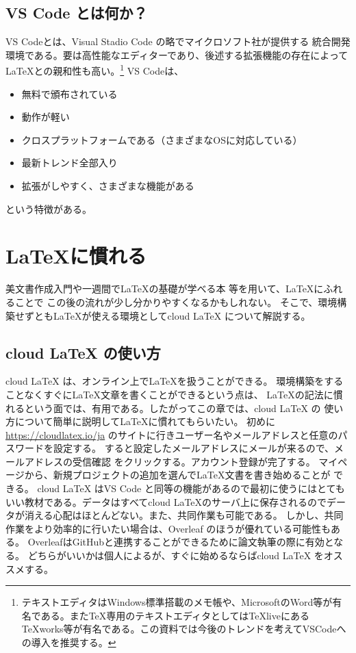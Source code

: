 \documentclass[titlepage]{ltjsarticle}
\begin{document}
\subsection{VS Code とは何か？}
VS Codeとは、Visual Stadio Code の略でマイクロソフト社が提供する
統合開発環境である。要は高性能なエディターであり、後述する拡張機能の存在によって\LaTeX との親和性も高い。\footnote{テキストエディタはWindows標準搭載のメモ帳や、MicrosoftのWord等が有名である。またTeX専用のテキストエディタとしてはTeXliveにあるTeXworks等が有名である。この資料では今後のトレンドを考えてVSCodeへの導入を推奨する。}
VS Codeは、
\begin{itemize}
  \item 無料で頒布されている
  \item 動作が軽い
  \item クロスプラットフォームである（さまざまなOSに対応している）
  \item 最新トレンド全部入り
  \item 拡張がしやすく、さまざまな機能がある
\end{itemize}
という特徴がある。

\section{\LaTeX に慣れる}
美文書作成入門\cite{美文書本}や一週間で\LaTeX の基礎が学べる本
\cite{一週間基礎}等を用いて、\LaTeX にふれることで
この後の流れが少し分かりやすくなるかもしれない。
そこで、環境構築せずとも\LaTeX が使える環境としてcloud LaTeX 
について解説する。

\subsection{cloud LaTeX の使い方}
cloud LaTeX は、オンライン上で\LaTeX を扱うことができる。
環境構築をすることなくすぐに\LaTeX 文章を書くことができるという点は、
\LaTeX の記法に慣れるという面では、有用である。したがってこの章では、cloud LaTeX の
使い方について簡単に説明して\LaTeX に慣れてもらいたい。
初めに
\url{https://cloudlatex.io/ja}\cite{cloudlatexログインページ}
のサイトに行きユーザー名やメールアドレスと任意のパスワードを設定する。
すると設定したメールアドレスにメールが来るので、メールアドレスの受信確認
をクリックする。アカウント登録が完了する。
マイページから、新規プロジェクトの追加を選んで\LaTeX 文書を書き始めることが
できる。
cloud LaTeX はVS Code と同等の機能があるので最初に使うにはとてもいい教材である。データはすべてcloud LaTeXのサーバ上に保存されるのでデータが消える心配はほとんどない。また、共同作業も可能である。
しかし、共同作業をより効率的に行いたい場合は、Overleaf のほうが優れている可能性もある。
OverleafはGitHubと連携することができるために論文執筆の際に有効となる。
どちらがいいかは個人によるが、すぐに始めるならばcloud LaTeX をオススメする。
\end{document}
